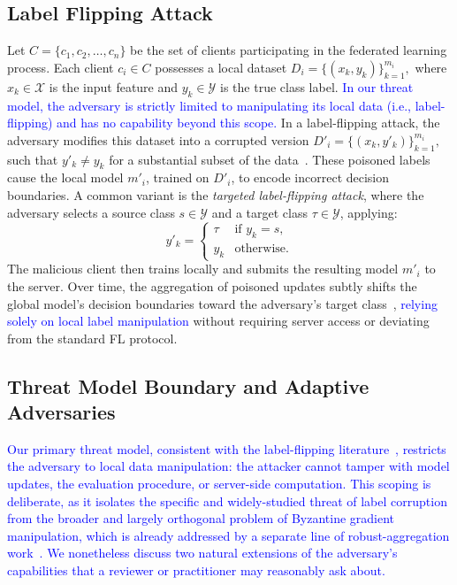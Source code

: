 \documentclass[conference]{IEEEtran}
\begin{document}
\subsection{Label Flipping Attack}
Let \(C = \{c_1, c_2, \ldots, c_n\}\) be the set of clients participating in the federated learning process. Each client \( c_i \in C \) possesses a local dataset \(D_i = \{(x_k, y_k)\}_{k=1}^{m_i},\) where \( x_k \in \mathcal{X} \) is the input feature and \( y_k \in \mathcal{Y} \) is the true class label. \textcolor{blue}{In our threat model, the adversary is strictly limited to manipulating its local data (i.e., label-flipping) and has no capability beyond this scope.} In a label-flipping attack, the adversary modifies this dataset into a corrupted version \(D'_i = \{(x_k, y'_k)\}_{k=1}^{m_i},\) such that \( y'_k \neq y_k \) for a substantial subset of the data~\cite{wang2020attack}. These poisoned labels cause the local model \( m'_i \), trained on \( D'_i \), to encode incorrect decision boundaries. A common variant is the \textit{targeted label-flipping attack}, where the adversary selects a source class \( s \in \mathcal{Y} \) and a target class \( \tau \in \mathcal{Y} \), applying:
\[
y'_k =
\begin{cases}
\tau & \text{if } y_k = s, \\
y_k & \text{otherwise.}
\end{cases}
\]
The malicious client then trains locally and submits the resulting model \( m'_i \) to the server. Over time, the aggregation of poisoned updates subtly shifts the global model's decision boundaries toward the adversary's target class~\cite{cao2020fltrust}, \textcolor{blue}{relying solely on local label manipulation} without requiring server access or deviating from the standard FL protocol.

\subsection{Threat Model Boundary and Adaptive Adversaries}
\label{sec:threatext}
\textcolor{blue}{Our primary threat model, consistent with the label-flipping literature~\cite{tolpegin2020data,jebreel2024lfighter}, restricts the adversary to local data manipulation: the attacker cannot tamper with model updates, the evaluation procedure, or server-side computation. This scoping is deliberate, as it isolates the specific and widely-studied threat of label corruption from the broader and largely orthogonal problem of Byzantine gradient manipulation, which is already addressed by a separate line of robust-aggregation work~\cite{yin2018byzantine,NIPS2017_f4b9ec30,mhamdi2018hidden}. We nonetheless discuss two natural extensions of the adversary's capabilities that a reviewer or practitioner may reasonably ask about.}
\end{document}
